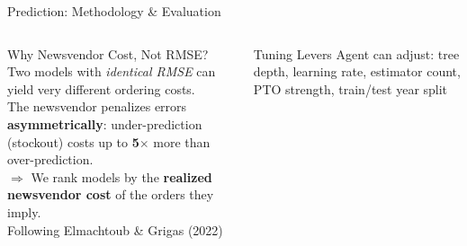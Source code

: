 \documentclass[aspectratio=169, 9pt]{beamer}
\begin{document}
\begin{frame}{Prediction: Methodology \& Evaluation}
\begin{columns}[T]
\begin{alertblock}{Why Newsvendor Cost, Not RMSE?}
\scriptsize
Two models with \emph{identical RMSE} can yield very different ordering costs.\\[3pt]
The newsvendor penalizes errors \textbf{asymmetrically}: under-prediction (stockout) costs up to \textbf{5$\times$} more than over-prediction.\\[3pt]
$\Rightarrow$ We rank models by the \textbf{realized newsvendor cost} of the orders they imply.\\[3pt]
{\tiny Following Elmachtoub \& Grigas (2022)}
\end{alertblock}

\vspace{3pt}
\begin{block}{Tuning Levers}
\scriptsize
Agent can adjust: tree depth, learning rate, estimator count, PTO strength, train/test year split
\end{block}
\end{columns}
\end{frame}
\end{document}
